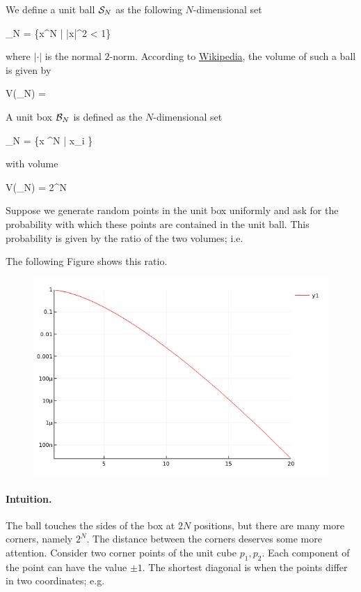 
We define a unit ball $\mathcal{S}_N$ as the following $N$-dimensional set

\bee
\Sc_N = \{x\in \mR^N | |x|^2 < 1\}
\eee

where $|\cdot|$ is the normal $2$-norm. According to \href{https://en.wikipedia.org/wiki/Volume_of_an_n-ball}{Wikipedia}, the volume of such a ball is given by

\bee
V(\Sc_N) = 
\eee

A unit box $\mathcal{B}_N$ is defined as the $N$-dimensional set

\bee
\Bc_N = \{x \in \mR^N | x_i \in [-1,1]\}
\eee

with volume

\bee
V(\Bc_N) = 2^N
\eee

Suppose we generate random points in the unit box uniformly and ask for the probability with which these points are contained in the unit ball. This probability is given by the ratio of the two volumes; i.e.

\bee
{}
\eee

The following Figure shows this ratio.

\begin{figure}[H]
	\includegraphics[scale=0.7]{images/high_dim_02_01.png}
\end{figure}

\paragraph{Intuition.} The ball touches the sides of the box at $2N$ positions, but there are many more corners, namely $2^N$. The distance between the corners deserves some more attention. Consider two corner points of the unit cube $p_1, p_2$. Each component of the point can have the value $\pm 1$. The shortest diagonal is when the points differ in two coordinates; e.g.

